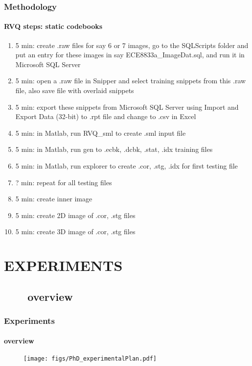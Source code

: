 \begin{frame}
\frametitle{Methodology}
\framesubtitle{RVQ steps: static codebooks}
\mypagenum
	\begin{enumerate}\tiny
		\item {\color{red} 5 min:} create .raw files for say 6 or 7 images, go to the SQLScripts folder and put an entry for these images in say ECE8833a\_ImageDat.sql, and run it in Microsoft SQL Server
		\item {\color{red} 5 min:} open a .raw file in Snipper and select training snippets from this .raw file, also save file with overlaid snippets
		\item {\color{red} 5 min:} export these snippets from Microsoft SQL Server using Import and Export Data (32-bit) to .rpt file and change to .csv in Excel
		\item {\color{red} 5 min:} in Matlab, run RVQ\_sml to create .sml input file
		\item {\color{red} 5 min:} in Matlab, run gen to .ecbk, .dcbk, .stat, .idx training files
		\item {\color{red} 5 min:} in Matlab, run explorer to create .cor, .stg, .idx for first testing file
		\item {\color{red} ? min:} repeat for all testing files		
		\item {\color{red} 5 min:} create inner image
		\item {\color{red} 5 min:} create 2D image of .cor, .stg files
		\item {\color{red} 5 min:} create 3D image of .cor, .stg files
	\end{enumerate}
\end{frame}




\section{EXPERIMENTS}
\subsection{\ \ \ \ overview}
\begin{frame}
\frametitle{Experiments}
\framesubtitle{overview}
\mypagenum
		\begin{figure}
			\texttt{[image: figs/PhD\_experimentalPlan.pdf]}
		\end{figure}
\end{frame}



